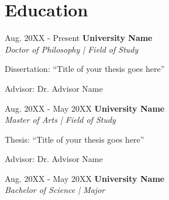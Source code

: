 \section{Education}

    \begin{twocolentry}{Aug. 20XX - Present}
        \textbf{University Name}\\
        \textit{Doctor of Philosophy | Field of Study}
        
        \vspace{0.10cm}
        \begin{onecolentry}
            \begin{highlights}
                \item Dissertation: ``Title of your thesis goes here''
                \item Advisor: Dr. Advisor Name
            \end{highlights}
        \end{onecolentry}

    \end{twocolentry}
    \vspace{0.2cm}

    \begin{twocolentry}{Aug. 20XX - May 20XX}
        \textbf{University Name}\\
        \textit{Master of Arts | Field of Study}
    \end{twocolentry}

    \vspace{0.10cm}
    \begin{onecolentry}
        \begin{highlights}
            \item Thesis: ``Title of your thesis goes here''
            \item Advisor: Dr. Advisor Name
        \end{highlights}
    \end{onecolentry}

    \vspace{0.2cm}

    \begin{twocolentry}{Aug. 20XX - May 20XX}
        \textbf{University Name}\\
        \textit{Bachelor of Science | Major}
    \end{twocolentry}
